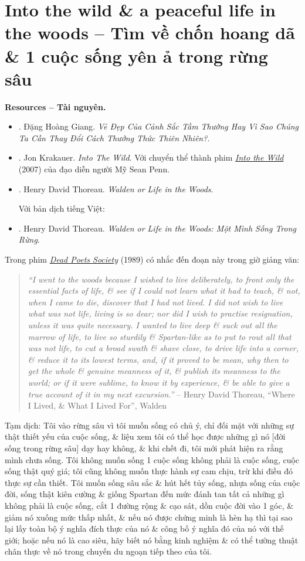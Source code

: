 \documentclass[12pt,twoside]{book}
\begin{document}
\section{Into the wild \& a peaceful life in the woods -- Tìm về chốn hoang dã \& 1 cuộc sống yên ả trong rừng sâu}
{\bf \textsf{Resources -- Tài nguyên.}}
\begin{itemize}
	\item \cite{Giang_nature}. {\sc Đặng Hoàng Giang}. {\it Vẻ Đẹp Của Cảnh Sắc Tầm Thường Hay Vì Sao Chúng Ta Cần Thay Đổi Cách Thưởng Thức Thiên Nhiên?}.
	\item \cite{Krakauer_wild}. {\sc Jon Krakauer}. {\it Into The Wild}. Với chuyển thể thành phim \href{https://www.imdb.com/title/tt0758758}{\it Into the Wild} (2007) của đạo diễn người Mỹ {\sc Sean Penn}.
	\item \cite{Thoreau_Walden}. {\sc Henry David Thoreau}. {\it Walden or Life in the Woods}.
	
	Với bản dịch tiếng Việt:
	\item \cite{Thoreau_Walden_VN}. {\sc Henry David Thoreau}. {\it Walden or Life in the Woods: Một Mình Sống Trong Rừng}.
\end{itemize}
Trong phim \href{https://www.imdb.com/title/tt0097165}{\it Dead Poets Society} (1989) có nhắc đến đoạn này trong giờ giảng văn:
\begin{quotation}
	{\it``I went to the woods because I wished to live deliberately, to front only the essential facts of life, \& see if I could not learn what it had to teach, \& not, when I came to die, discover that I had not lived. I did not wish to live what was not life, living is so dear; nor did I wish to practise resignation, unless it was quite necessary. I wanted to live deep \& suck out all the marrow of life, to live so sturdily \& Spartan-like as to put to rout all that was not life, to cut a broad swath \& shave close, to drive life into a corner, \& reduce it to its lowest terms, and, if it proved to be mean, why then to get the whole \& genuine meanness of it, \& publish its meanness to the world; or if it were sublime, to know it by experience, \& be able to give a true account of it in my next excursion.''} -- {\sc Henry David Thoreau}, ``Where I Lived, \& What I Lived For'', Walden \cite{Thoreau_Walden}
\end{quotation}
{\sf Tạm dịch}: Tôi vào rừng sâu vì tôi muốn sống có chủ ý, chỉ đối mặt với những sự thật thiết yếu của cuộc sống, \& liệu xem tôi có thể học được những gì nó [đời sống trong rừng sâu] dạy hay không, \& khi chết đi, tôi mới phát hiện ra rằng mình chưa sống. Tôi không muốn sống 1 cuộc sống không phải là cuộc sống, cuộc sống thật quý giá; tôi cũng không muốn thực hành sự cam chịu, trừ khi điều đó thực sự cần thiết. Tôi muốn sống sâu sắc \& hút hết tủy sống, nhựa sống của cuộc đời, sống thật kiên cường \& giống Spartan đến mức đánh tan tất cả những gì không phải là cuộc sống, cắt 1 đường rộng \& cạo sát, dồn cuộc đời vào 1 góc, \& giảm nó xuống mức thấp nhất, \& nếu nó được chứng minh là hèn hạ thì tại sao lại lấy toàn bộ ý nghĩa đích thực của nó \& công bố ý nghĩa đó của nó với thế giới; hoặc nếu nó là cao siêu, hãy biết nó bằng kinh nghiệm \& có thể tường thuật chân thực về nó trong chuyến du ngoạn tiếp theo của tôi.
\end{document}
